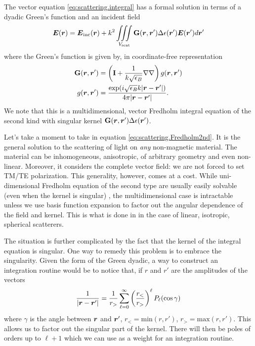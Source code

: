 The vector equation \eqref{eq:scattering.integral} has a formal solution in terms 
of a dyadic Green's function \cite{NOV2012} and an incident field \cite{deL2013}
  \begin{equation}
   \boldsymbol{E}(\boldsymbol{r}) = \boldsymbol{E}_\text{inc}(\boldsymbol{r}) + k^2\mathop{\iiint}_{V_\text{scat}} \mathbf{G}(\boldsymbol{r},\boldsymbol{r}')\Delta\epsilon(\boldsymbol{r}')\boldsymbol{E}(\boldsymbol{r}')d\boldsymbol{r}'\label{eq:scattering.Fredholm2nd}
  \end{equation}
where the Green's function is given by, in coordinate-free representation
  \begin{align}
    \mathbf{G}(\boldsymbol{r},\boldsymbol{r}')	&= \left(\mathbf{I}+\frac{1}{k\sqrt{\epsilon_B}}\nabla\nabla\right)g(\boldsymbol{r},\boldsymbol{r}')	\\
    g(\boldsymbol{r},\boldsymbol{r}')		&= \frac{\exp(i\sqrt{\epsilon_B}k|\boldsymbol{r}-\boldsymbol{r}'|)}{4\pi|\boldsymbol{r}-\boldsymbol{r}'|}.
  \end{align}
We note that this is a multidimensional, vector Fredholm integral equation of the second kind with
singular kernel $\mathbf{G}(\boldsymbol{r},\boldsymbol{r}')\Delta\epsilon(\boldsymbol{r}')$.

Let's take a moment to take in equation \eqref{eq:scattering.Fredholm2nd}. It is the general
solution to the scattering of light on \textit{any} non-magnetic material. The material can be
inhomogeneous, anisotropic, of arbitrary geometry and even non-linear. Moreover, it considers
the complete vector field: we are not forced to set TM/TE polarization. This generality, however, 
comes at a cost. While uni-dimensional Fredholm equation of the second type are usually easily solvable
(even when the kernel is singular) \cite{DEL1985}, the multidimensional case is intractable unless
we use basis function expansion to factor out the angular dependence of the 
field and kernel. This is what is done in \cite{deL2013} in the case of linear, isotropic, 
spherical scatterers.

The situation  is 
further complicated by the fact that the kernel of the integral equation is singular. 
One way to remedy this problem is to embrace the singularity. Given the form
of the Green dyadic, a way to construct an integration routine would be
to notice that, if $r$ and $r'$ are the amplitudes of the vectors
  \begin{equation}
   \frac{1}{|\boldsymbol{r}-\boldsymbol{r}'|} = \frac{1}{r_>}\sum_{\ell=0}^\infty \left(\frac{r_<}{r_>}\right)^\ell P_\ell(\cos\gamma)
  \end{equation}
where $\gamma$ is the angle between $\boldsymbol{r}$ and $\boldsymbol{r}'$, $r_<=\text{min}(r,r')$, 
$r_>=\text{max}(r,r')$. 
This allows us to factor out the singular part of the kernel. There will 
then be poles of orders up to $\ell+1$ which we can use
as a weight for an integration routine.

